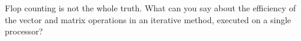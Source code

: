   Flop counting is not the whole truth. What can you say about the
  efficiency of the vector and matrix operations in an iterative
  method, executed on a single processor?
